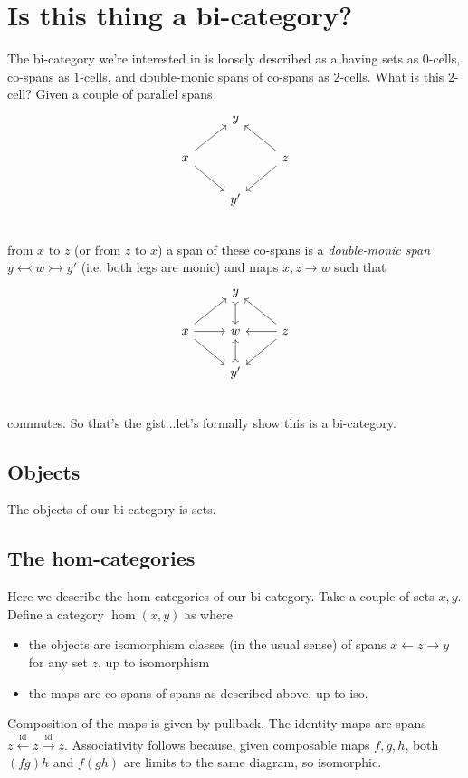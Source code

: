 \documentclass[12pt]{article}
\renewcommand{\(}{\left(}
\renewcommand{\)}{\right)}
\renewcommand{\{}{\left\lbrace}
\renewcommand{\}}{\right\rbrace}
\DeclareMathOperator{\id}{id}
\theoremstyle{remark}
\theoremstyle{definition}
\begin{document}
	
\section*{Is this thing a bi-category?}
The bi-category we're interested in is loosely described as a having sets as $0$-cells, co-spans as $1$-cells, and double-monic spans of co-spans as $2$-cells.  What is this $2$-cell? Given a couple of parallel spans
\[
	\begin{tikzcd}
		{} &
		{y} &
		{} \\
		{x} 
			\ar[ru]
			\ar[rd] &
		{} &
		{z} 
			\ar[lu]
			\ar[ld] \\
		{} &
		{y'} &
		{} \\
	\end{tikzcd} 
\]
from $x$ to $z$ (or from $z$ to $x$) a span of these co-spans is a \textit{double-monic span} $y \leftarrowtail w \rightarrowtail y'$ (i.e. both legs are monic) and maps $x,z \to w$ such that
\[
\begin{tikzcd}
		{} &
		{y} 
			\ar[d,rightarrowtail]&
		{} \\
		{x} 
			\ar[ru]
			\ar[r]
			\ar[rd] &
		{w} &
		{z} 
			\ar[lu]
			\ar[l]
			\ar[ld] \\
		{} &
		{y'} 
			\ar[u,rightarrowtail]&
		{} \\
	\end{tikzcd} 
\]
commutes.  So that's the gist...let's formally show this is a bi-category.

\subsection*{Objects}

The objects of our bi-category is sets.

\subsection*{The hom-categories}

Here we describe the hom-categories of our bi-category. Take a couple of sets $x,y$.  Define a category $\hom (x,y)$ as where
\begin{itemize}
	\item the objects are isomorphism classes (in the usual sense) of spans $x \leftarrow z \rightarrow y$ for any set $z$, up to isomorphism
	\item the maps are co-spans of spans as described above, up to iso.
\end{itemize}
Composition of the maps is given by pullback. The identity maps are spans $z \xleftarrow{\id} z \xrightarrow{\id} z$. Associativity follows because, given composable maps $f,g,h$, both $(fg)h$ and $f(gh)$ are limits to the same diagram, so isomorphic.  
\end{document}
